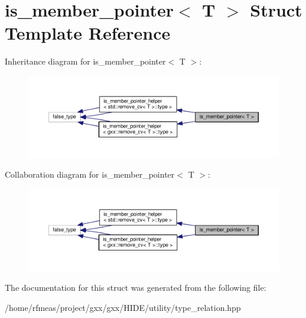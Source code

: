 \hypertarget{structis__member__pointer}{}\section{is\+\_\+member\+\_\+pointer$<$ T $>$ Struct Template Reference}
\label{structis__member__pointer}


Inheritance diagram for is\+\_\+member\+\_\+pointer$<$ T $>$\+:
\nopagebreak
\begin{figure}[H]
\begin{center}
\leavevmode
\includegraphics[width=350pt]{structis__member__pointer__inherit__graph}
\end{center}
\end{figure}


Collaboration diagram for is\+\_\+member\+\_\+pointer$<$ T $>$\+:
\nopagebreak
\begin{figure}[H]
\begin{center}
\leavevmode
\includegraphics[width=350pt]{structis__member__pointer__coll__graph}
\end{center}
\end{figure}


The documentation for this struct was generated from the following file\+:\begin{DoxyCompactItemize}
\item 
/home/rfmeas/project/gxx/gxx/\+H\+I\+D\+E/utility/type\+\_\+relation.\+hpp\end{DoxyCompactItemize}
